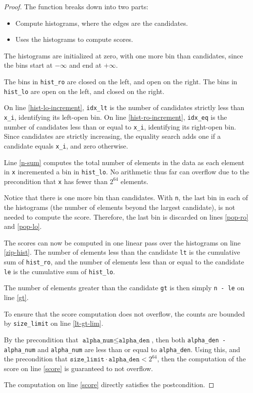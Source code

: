 \documentclass{article}
\begin{document}
\begin{proof}
    The function breaks down into two parts:
    \begin{itemize}
        \item Compute histograms, where the edges are the candidates.
        \item Uses the histograms to compute scores.
    \end{itemize}

    The histograms are initialized at zero, with one more bin than candidates,
    since the bins start at $-\infty$ and end at $+\infty$.

    The bins in \texttt{hist\_ro} are closed on the left, and open on the right.
    The bins in \texttt{hist\_lo} are open on the left, and closed on the right.

    On line \ref{hist-lo-increment}, \texttt{idx\_lt} is the number of candidates strictly less than \texttt{x\_i}, identifying its left-open bin.
    On line \ref{hist-ro-increment}, \texttt{idx\_eq} is the number of candidates less than or equal to \texttt{x\_i}, identifying its right-open bin.
    Since candidates are strictly increasing, the equality search adds one if a candidate equals \texttt{x\_i}, and zero otherwise.

    Line \ref{n-sum} computes the total number of elements in the data as each element in \texttt{x} incremented a bin in \texttt{hist\_lo}.
    No arithmetic thus far can overflow due to the precondition that \texttt{x} has fewer than $2^{64}$ elements.

    Notice that there is one more bin than candidates.
    With \texttt{n}, the last bin in each of the histograms (the number of elements beyond the largest candidate),
    is not needed to compute the score.
    Therefore, the last bin is discarded on lines \ref{pop-ro} and \ref{pop-lo}.

    The scores can now be computed in one linear pass over the histograms on line \ref{zip-hist}.
    The number of elements less than the candidate \texttt{lt} is the cumulative sum of \texttt{hist\_ro},
    and the number of elements less than or equal to the candidate \texttt{le} is the cumulative sum of \texttt{hist\_lo}.

    The number of elements greater than the candidate \texttt{gt} is then simply \texttt{n - le} on line \ref{gt}.

    To ensure that the score computation does not overflow, the counts are bounded by \texttt{size\_limit} on line \ref{lt-gt-lim}.

    By the precondition that $\texttt{alpha\_num} \le \texttt{alpha\_den}$,
    then both \texttt{alpha\_den - alpha\_num} and \texttt{alpha\_num} are less than or equal to \texttt{alpha\_den}.
    Using this, and the precondition that $\texttt{size\_limit} \cdot \texttt{alpha\_den} < 2^{64}$,
    then the computation of the score on line \ref{score} is guaranteed to not overflow.

    The computation on line \ref{score} directly satisfies the postcondition.
\end{proof}
\end{document}
